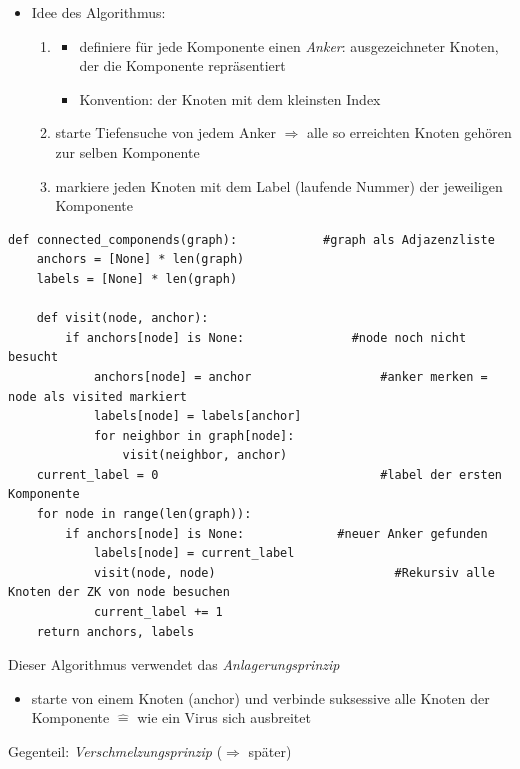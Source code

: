 \documentclass[11pt, fleqn]{scrreprt}
\begin{document}
\begin{itemize}
            \item Idee des Algorithmus:
            \begin{enumerate}
            \item
            \begin{itemize}
            \item definiere für jede Komponente einen \emph{Anker}: ausgezeichneter Knoten, der die Komponente repräsentiert
            \item Konvention: der Knoten mit dem kleinsten Index
            \end{itemize}
            \item starte Tiefensuche von jedem Anker $\Rightarrow$ alle so erreichten Knoten gehören zur selben Komponente
            \item markiere jeden Knoten mit dem Label (laufende Nummer) der jeweiligen Komponente
            \end{enumerate}
            \end{itemize}

            \begin{verbatim}
def connected_componends(graph):            #graph als Adjazenzliste
    anchors = [None] * len(graph)
    labels = [None] * len(graph)

    def visit(node, anchor):
        if anchors[node] is None:               #node noch nicht besucht
            anchors[node] = anchor                  #anker merken = node als visited markiert
            labels[node] = labels[anchor]
            for neighbor in graph[node]:
                visit(neighbor, anchor)
    current_label = 0                               #label der ersten Komponente
    for node in range(len(graph)):
        if anchors[node] is None:             #neuer Anker gefunden
            labels[node] = current_label
            visit(node, node)                         #Rekursiv alle Knoten der ZK von node besuchen
            current_label += 1
    return anchors, labels
            \end{verbatim}
            Dieser Algorithmus verwendet das \emph{Anlagerungsprinzip}
            \begin{itemize}
                \item starte von einem Knoten (anchor) und verbinde suksessive alle Knoten der Komponente $\widehat{=}$ wie ein Virus sich ausbreitet
            \end{itemize}
            Gegenteil: \emph{Verschmelzungsprinzip} ($\Rightarrow$ später)\\
\end{document}
